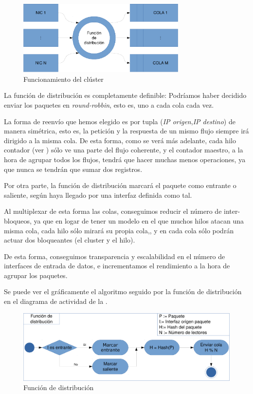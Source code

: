 \begin{figure}[htbp]
\centering
\includegraphics[width=0.75\textwidth]{CapituloEstructura/Figuras/Cluster-crop}
\caption{Funcionamiento del clúster}
\end{figure}
%

La función de distribución es completamente definible: Podríamos haber decidido enviar los paquetes en 
\emph{round-robbin}, esto es, uno a cada cola cada vez.

La forma de reenvío que hemos elegido es por tupla (\emph{IP origen},\emph{IP destino}) de manera simétrica, esto es, 
la petición y la respuesta de un mismo flujo siempre irá dirigido a la misma cola. De esta forma, como se verá más 
adelante, cada hilo contador (ver ) sólo ve una parte del flujo coherente, y el contador maestro, a 
la hora de agrupar todos los flujos, tendrá que hacer muchas menos operaciones, ya que nunca se tendrán que sumar dos 
registros.

Por otra parte, la función de distribución marcará el paquete como entrante o saliente, según haya llegado por una 
interfaz definida como tal.

Al multiplexar de esta forma las colas, conseguimos reducir el número de inter-bloqueos, ya que en 
logar de tener un modelo en el que muchos hilos atacan una misma cola, cada hilo sólo mirará su propia cola,, y en cada 
cola sólo podrán actuar dos bloqueantes (el cluster y el hilo).

De esta forma, conseguimos transparencia y escalabilidad en el número de interfaces de entrada de datos, e 
incrementamos el rendimiento a la hora de agrupar los paquetes.

Se puede ver el gráficamente el algoritmo seguido por la función de distribución en el diagrama de actividad de la 
.

\begin{figure}[htbp]
\centering
\includegraphics[width=\textwidth]{CapituloEstructura/Figuras/ActividadFuncionDistribucionCluster-crop}
\caption{Función de distribución}
\end{figure}
%

